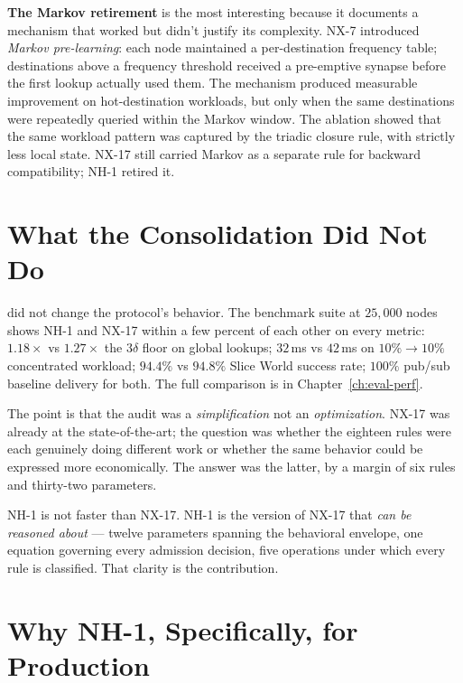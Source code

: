 \documentclass[twoside,nobib]{tufte-book}
\begin{document}
\textbf{The Markov retirement} is the most interesting because it
documents a mechanism that worked but didn't justify its
complexity. NX-7 introduced \emph{Markov pre-learning}: each
node maintained a per-destination frequency table; destinations
above a frequency threshold received a pre-emptive synapse before
the first lookup actually used them. The mechanism produced
measurable improvement on hot-destination workloads, but only when
the same destinations were repeatedly queried within the Markov
window. The ablation showed that the same workload pattern was
captured by the triadic closure rule, with strictly less local
state. NX-17 still carried Markov as a separate rule for
backward compatibility; NH-1 retired it.

\section{What the Consolidation Did Not Do}
\label{sec:nh1-nondelta}

 did not change the protocol's
behavior. The benchmark suite at $25{,}000$ nodes shows NH-1 and
NX-17 within a few percent of each other on every metric:
$1.18\times$ vs $1.27\times$ the $3\delta$ floor on global
lookups; $32$\,ms vs $42$\,ms on $10\% \to 10\%$ concentrated
workload; $94.4\%$ vs $94.8\%$ Slice World success rate;
$100\%$ pub/sub baseline delivery for both. The full comparison
is in Chapter~\ref{ch:eval-perf}.

The point is that the audit was a \emph{simplification} not an
\emph{optimization}. NX-17 was already at the
state-of-the-art; the question was whether the eighteen rules
were each genuinely doing different work or whether the same
behavior could be expressed more economically. The answer was
the latter, by a margin of six rules and thirty-two parameters.

NH-1 is not faster than NX-17. NH-1 is the version of NX-17 that
\emph{can be reasoned about} --- twelve parameters spanning the
behavioral envelope, one equation governing every admission
decision, five operations under which every rule is classified.
That clarity is the contribution.

\section{Why NH-1, Specifically, for Production}
\label{sec:nh1-deploy-rationale}
\end{document}
